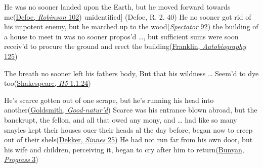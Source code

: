 \ea \label{ex:12-119}
\ea
He was no sooner landed upon the Earth, but he moved forward towards me\hfill(\href{https://archive.org/details/lifeandstranges00dobsgoog/page/n127/mode/2up?q=%22landed+upon+the+Earth%22&view=theater}{Defoe, \textit{Robinson} 102}) %
\ex {[}unidentified{]} 
\hfill(Defoe, R. 2. 40) %
\ex
He no sooner got rid of his impotent enemy, but he marched up to the wood\hfill(\href{https://archive.org/details/spectatornewedre00addiuoft/page/92/mode/2up?q=%22sooner+got+rid+of+his+impotent%22&view=theater}{\textit{Spectator} 92}) %
\ex
the building of a house to meet in was no sooner propos'd {\dots}, but sufficient sums were soon receiv'd to procure the ground and erect the building\hfill(\href{https://archive.org/details/benjaminfrautobio00franrich/page/252/mode/2up?q=%22no+sooner%22&view=theater}{Franklin, \textit{Autobiography} 125}) %
\z
\z

\ea \label{ex:12-119a}
The breath no sooner left his fathers body, But that his wildness {\dots} Seem'd to dye too\hfill(\href{https://internetshakespeare.uvic.ca/doc/H5_F1/scene/1.1/index.html#tln-65}{Shakespeare, \textit{H5} 1.1.24})
\z

\ea \label{ex:12-119b}
\ea
He's scarce gotten out of one scrape, but he's running his head into another\hfill(\href{https://quod.lib.umich.edu/cgi/t/text/pageviewer-idx?c=ecco;cc=ecco;idno=004771299.0001.000;node=004771299.0001.000:6.1;seq=161;page=root;view=text}{Goldsmith, \textit{Good-natur'd}})
\ex \label{ex:Dekker}
Scarce was his entrance blown abroad, but the banckrupt, the fellon, and all that owed any mony, and {\dots} had like so many snayles kept their houses ouer their heads al the day before, began now to creep out of their shels\hfill(\href{https://archive.org/details/nondramaticworks02dekkrich/page/40/mode/2up?q=%22Scarce+was+his%22&view=theater}{Dekker, \textit{Sinnes} 25}) 
\ex
He had not run far from his own door, but his wife and children, perceiving it, began to cry after him to return\hfill(\href{https://archive.org/details/bunyanspilgrims00moffgoog/page/14/mode/2up?q=%22run+far+from+his+own+door%22&view=theater}{Bunyan, \textit{Progress} 3}) %
\z
\z

